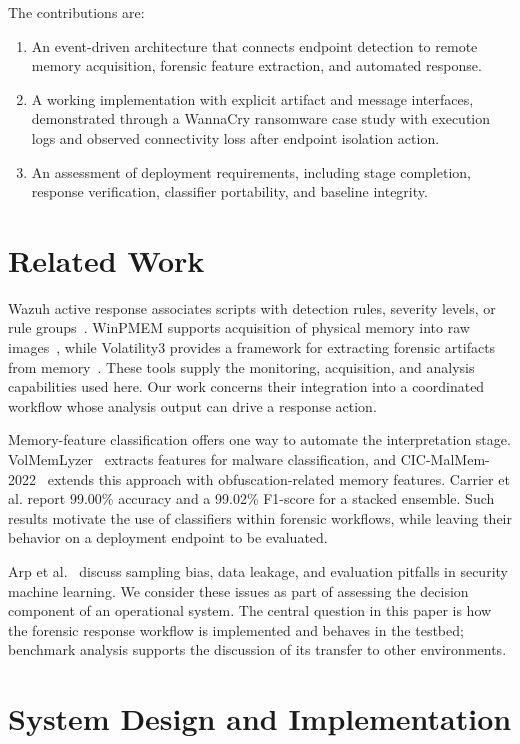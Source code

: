 \documentclass[conference]{IEEEtran}
\begin{document}
The contributions are:
\begin{enumerate}
\item An event-driven architecture that connects endpoint detection to remote memory acquisition, forensic feature extraction, and automated response. 
\item A working implementation with explicit artifact and message interfaces, demonstrated through a WannaCry ransomware case study with execution logs and observed connectivity loss after endpoint isolation action.
\item An assessment of deployment requirements, including stage completion, response verification, classifier portability, and baseline integrity.
\end{enumerate}

\section{Related Work}

Wazuh active response associates scripts with detection rules, severity levels, or rule groups~\cite{wazuh}. WinPMEM supports acquisition of physical memory into raw images~\cite{winpmem}, while Volatility3 provides a framework for extracting forensic artifacts from memory~\cite{volatility}. These tools supply the monitoring, acquisition, and analysis capabilities used here. Our work concerns their integration into a coordinated workflow whose analysis output can drive a response action.

Memory-feature classification offers one way to automate the interpretation stage. VolMemLyzer~\cite{lashkari2021} extracts features for malware classification, and CIC-MalMem-2022~\cite{carrier2022} extends this approach with obfuscation-related memory features. Carrier et al. report 99.00\% accuracy and a 99.02\% F1-score for a stacked ensemble. Such results motivate the use of classifiers within forensic workflows, while leaving their behavior on a deployment endpoint to be evaluated.

Arp et al.~\cite{arp2022} discuss sampling bias, data leakage, and evaluation pitfalls in security machine learning. We consider these issues as part of assessing the decision component of an operational system. The central question in this paper is how the forensic response workflow is implemented and behaves in the testbed; benchmark analysis supports the discussion of its transfer to other environments.

\section{System Design and Implementation}
\label{sec:architecture}
\end{document}
